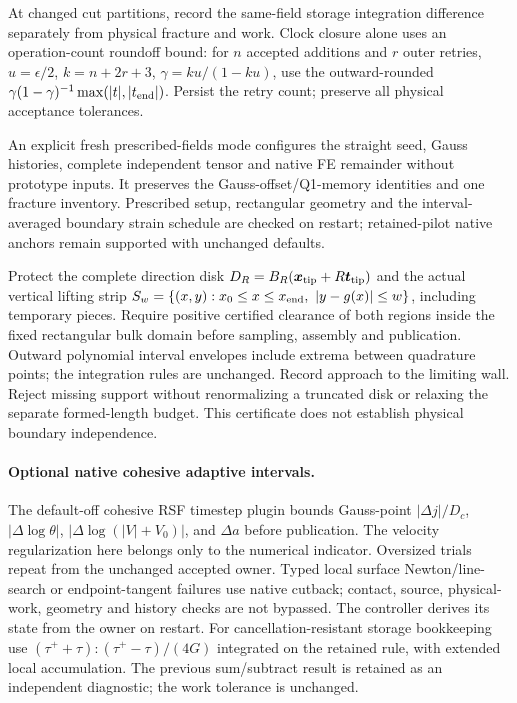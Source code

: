\documentclass[11pt]{article}
\begin{document}
At changed cut partitions, record the same-field storage integration difference
separately from physical fracture and work. Clock closure alone uses an
operation-count roundoff bound: for $n$ accepted additions and $r$ outer retries,
$u=\epsilon/2$, $k=n+2r+3$, $\gamma=ku/(1-ku)$, use the outward-rounded
$\gamma(1-\gamma)^{-1}\max(|t|,|t_{\rm end}|)$. Persist the retry count; preserve
all physical acceptance tolerances.

An explicit fresh prescribed-fields mode configures the straight seed, Gauss
histories, complete independent tensor and native FE remainder without prototype
inputs. It preserves the Gauss-offset/Q1-memory identities and one fracture
inventory. Prescribed setup, rectangular geometry and the interval-averaged
boundary strain schedule are checked on restart; retained-pilot native anchors
remain supported with unchanged defaults.

Protect the complete direction disk
$D_R=B_R(\boldsymbol{x}_{\rm tip}+R\boldsymbol{t}_{\rm tip})$ and the actual
vertical lifting strip
$S_w=\{(x,y):x_0\le x\le x_{\rm end},\ |y-g(x)|\le w\}$, including temporary
pieces. Require positive certified clearance of both regions inside the fixed
rectangular bulk domain before sampling, assembly and publication. Outward
polynomial interval envelopes include extrema between quadrature points; the
integration rules are unchanged. Record approach to the limiting wall. Reject
missing support without renormalizing a truncated disk or relaxing the separate
formed-length budget. This certificate does not establish physical boundary
independence.

\paragraph{Optional native cohesive adaptive intervals.}
The default-off cohesive RSF timestep plugin bounds Gauss-point
$|\Delta j|/D_c$, $|\Delta\log\theta|$,
$|\Delta\log(|V|+V_0)|$, and $\Delta a$ before publication.
The velocity regularization here belongs only to the numerical indicator.
Oversized trials repeat from the unchanged accepted owner. Typed local surface
Newton/line-search or endpoint-tangent failures use native cutback; contact,
source, physical-work, geometry and history checks are not bypassed.
The controller derives its state from the owner on restart.
For cancellation-resistant storage bookkeeping use
$(\tau^++\tau):(\tau^+-\tau)/(4G)$ integrated on the retained rule, with
extended local accumulation. The previous sum/subtract result is retained as an
independent diagnostic; the work tolerance is unchanged.
\end{document}
